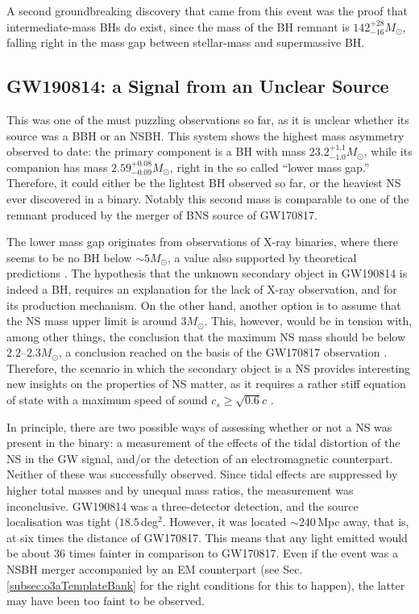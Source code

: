 \documentclass[binding=0.6cm, LaM]{sapthesis}
\begin{document}
	A second groundbreaking discovery that came from this event 
	was the proof that intermediate-mass BHs do exist,
	since the mass of the BH remnant is $142^{+28}_{-16}M_\odot$, 
	falling right in the mass gap between stellar-mass and supermassive BH.

\subsection{GW190814: a Signal from an Unclear Source}
\label{subsec:GW190814}
	This was one of the must puzzling observations so far, as it is unclear
	whether its source was a BBH or an NSBH.
	This system shows the highest mass asymmetry observed to date:
	the primary component is a BH with mass $23.2^{+1.1}_{-1.0}M_\odot$, 
	while its companion has mass $2.59^{+0.08}_{-0.09}M_\odot$, right in the so called
	``lower mass gap.''  Therefore, it could either be the lightest BH
	observed so far, or the heaviest NS ever discovered in a binary.
        Notably this second mass is comparable to one of the remnant 
	produced by the merger of BNS source of GW170817.

	The lower mass gap originates from observations of X-ray binaries, 
	where there seems to be no BH below $\sim 5M_\odot$,
	a value also supported by theoretical predictions \cite{124}.
	The hypothesis that the unknown secondary object in GW190814 is indeed a BH, 
	requires an explanation for the lack of X-ray observation, 
	and for its production mechanism.
	On the other hand, another option is to assume that the NS mass upper limit is around $3M_\odot$.
	This, however, would be in tension with, among other things, the conclusion that 
        the maximum NS mass should be below $2.2$--$2.3M_\odot$, 
	a conclusion reached on the basis of the GW170817 observation \cite{122,123}.
	Therefore, the scenario in which the secondary object is a NS provides interesting new insights on the properties of NS matter, 
	as it requires a rather stiff equation of state with a maximum speed of sound $c_s \geq \sqrt{0.6}c$ \cite{121}.

	In principle, there are two possible ways of assessing whether or not a NS was present in the binary: 
	a measurement of the effects of the tidal distortion of the NS 
	in the GW signal, and/or the detection of an electromagnetic counterpart.
        Neither of these was successfully observed.
	Since tidal effects are suppressed by higher total masses 	
	and by unequal mass ratios, the measurement was inconclusive. 
	GW190814 was a three-detector detection, and the source localisation was tight ($18.5\,$deg$^2$.
	However, it was located $\sim 240\,$Mpc away, that is,
	at six times the distance of GW170817.
	This means that any light emitted would be about 36 times fainter in comparison to GW170817.
	Even if the event was a NSBH merger accompanied by an EM counterpart
	(see Sec.\,\ref{subsec:o3aTemplateBank} for the right conditions for this to happen), 
	the latter may have been too faint to be observed.
\end{document}
